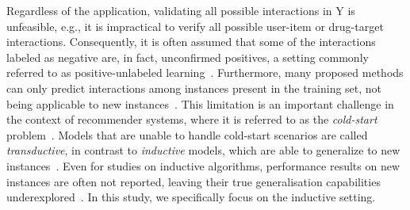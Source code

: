 \documentclass[sn-mathphys-num]{sn-jnl}%
\theoremstyle{thmstyleone}%
\theoremstyle{thmstyletwo}%
\theoremstyle{thmstylethree}%
\begin{document}
Regardless of the application, validating all possible interactions in Y is unfeasible, e.g., it is impractical to verify all possible user-item or drug-target interactions. Consequently, it is often assumed that some of the interactions labeled as negative are, in fact, unconfirmed positives, a setting commonly referred to as positive-unlabeled learning~\cite{bekker2020learning}.
Furthermore, many proposed methods can only predict interactions among instances present in the training set, not being applicable to new instances~\cite{schrynemackers_protocols_2013,pahikkala_toward_2015}. This limitation is an important challenge in the context of recommender systems, where it is referred to as the \emph{cold-start} problem~\cite{gharahighehi_addressing_2022}. Models that are unable to handle cold-start scenarios are called \emph{transductive}, in contrast to \emph{inductive} models, which are able to generalize to new instances~\cite{chapelle_semi-supervised_2006}. Even for studies on inductive algorithms, performance results on new instances are often not reported, leaving their true generalisation capabilities underexplored~\cite{park_flaws_2012,schrynemackers_protocols_2013,pahikkala_toward_2015}. In this study, we specifically focus on the inductive setting.

\end{document}
